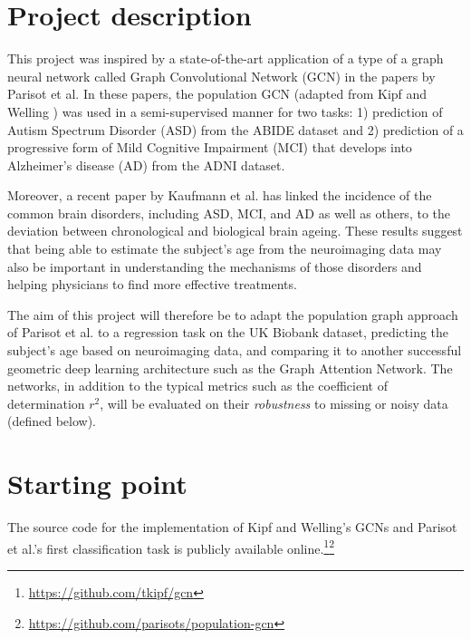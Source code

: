 \documentclass[12pt,a4paper,twoside]{article}
\begin{document}
\section*{Project description}
This project was inspired by a state-of-the-art application of a type of a graph neural network called Graph Convolutional Network (GCN) in the papers by Parisot et al. \cite{parisot2017spectral, parisot2018disease} In these papers, the population GCN (adapted from Kipf and Welling \cite{kipf2017semi}) was used in a semi-supervised manner for two tasks: 1) prediction of Autism Spectrum Disorder (ASD) from the ABIDE dataset and 2) prediction of a progressive form of Mild Cognitive Impairment (MCI) that develops into Alzheimer's disease (AD) from the ADNI dataset.

Moreover, a recent paper by Kaufmann et al. \cite{kaufmann2019} has linked the incidence of the common brain disorders, including ASD, MCI, and AD as well as others, to the deviation between chronological and biological brain ageing. These results suggest that being able to estimate the subject's age from the neuroimaging data may also be important in understanding the mechanisms of those disorders and helping physicians to find more effective treatments.

The aim of this project will therefore be to adapt the population graph approach of Parisot et al. \cite{parisot2018disease} to a regression task on the UK Biobank dataset, predicting the subject's age based on neuroimaging data, and comparing it to another successful geometric deep learning architecture such as the Graph Attention Network. \cite{velickovic2018graph} The networks, in addition to the typical metrics such as the coefficient of determination $r^2$, will be evaluated on their \textit{robustness} to missing or noisy data (defined below).

\section*{Starting point}

The source code for the implementation of Kipf and Welling's \cite{kipf2017semi} GCNs and Parisot et al.'s \cite{parisot2018disease} first classification task is publicly available online.\footnote{\url{https://github.com/tkipf/gcn}}\footnote{\url{https://github.com/parisots/population-gcn}}
\end{document}

